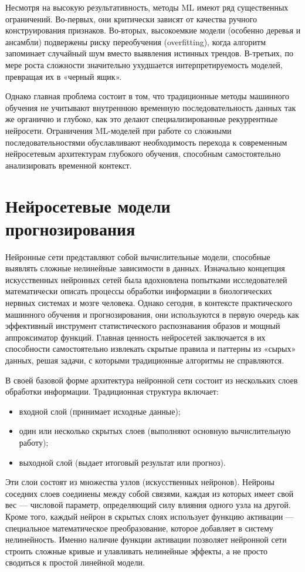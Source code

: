 Несмотря на высокую результативность, методы ML имеют ряд существенных ограничений. Во-первых, они критически зависят от качества ручного конструирования признаков. Во-вторых, высокоемкие модели (особенно деревья и ансамбли) подвержены риску переобучения (overfitting), когда алгоритм запоминает случайный шум вместо выявления истинных трендов. В-третьих, по мере роста сложности значительно ухудшается интерпретируемость моделей, превращая их в «черный ящик». 

Однако главная проблема состоит в том, что традиционные методы машинного обучения не учитывают внутреннюю временную последовательность данных так же органично и глубоко, как это делают специализированные рекуррентные нейросети. Ограничения ML-моделей при работе со сложными последовательностями обуславливают необходимость перехода к современным нейросетевым архитектурам глубокого обучения, способным самостоятельно анализировать временной контекст.

\section{Нейросетевые модели прогнозирования}
Нейронные сети представляют собой вычислительные модели, способные выявлять сложные нелинейные зависимости в данных. Изначально концепция искусственных нейронных сетей была вдохновлена попытками исследователей математически описать процессы обработки информации в биологических нервных системах и мозге человека. Однако сегодня, в контексте практического машинного обучения и прогнозирования, они используются в первую очередь как эффективный инструмент статистического распознавания образов и мощный аппроксиматор функций. Главная ценность нейросетей заключается в их способности самостоятельно извлекать скрытые правила и паттерны из «сырых» данных, решая задачи, с которыми традиционные алгоритмы не справляются.

В своей базовой форме архитектура нейронной сети состоит из нескольких слоев обработки информации. Традиционная структура включает:
\begin{itemize}
    \item входной слой (принимает исходные данные);
    \item один или несколько скрытых слоев (выполняют основную вычислительную работу);
    \item выходной слой (выдает итоговый результат или прогноз).
\end{itemize}

Эти слои состоят из множества узлов (искусственных нейронов). Нейроны соседних слоев соединены между собой связями, каждая из которых имеет свой вес — числовой параметр, определяющий силу влияния одного узла на другой. Кроме того, каждый нейрон в скрытых слоях использует функцию активации — специальное математическое преобразование, которое добавляет в систему нелинейность. Именно наличие функции активации позволяет нейронной сети строить сложные кривые и улавливать нелинейные эффекты, а не просто сводиться к простой линейной модели.

